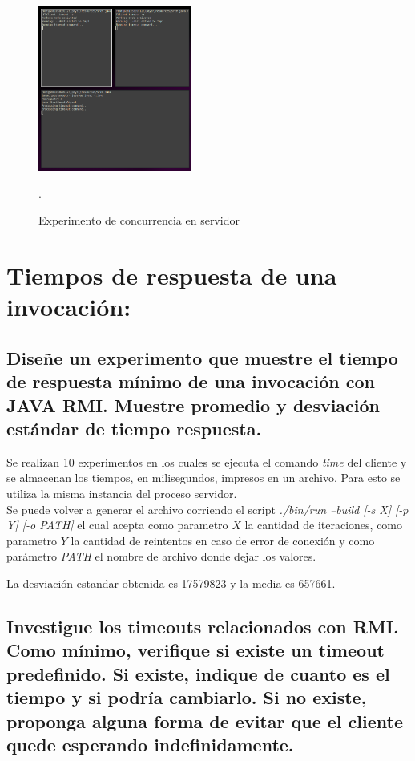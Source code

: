 \documentclass[osajnl,twocolumn,showpacs,superscriptaddress,10pt]{revtex4-1} %
\begin{document}
\begin{figure}[H]
    \centering
    \includegraphics[width=0.45\textwidth]{concu}
    \caption{Experimento de concurrencia en servidor}.
    \label{figure:concu}
\end{figure}

\section{Tiempos de respuesta de una invocación:}

\subsection{Diseñe un experimento que muestre el tiempo de respuesta mínimo de una invocación con
JAVA RMI. Muestre promedio y desviación estándar de tiempo respuesta.}

Se realizan 10 experimentos en los cuales se ejecuta el comando \textit{time} del cliente y se almacenan
los tiempos, en milisegundos, impresos en un archivo. Para esto se utiliza la misma instancia del proceso servidor. \\

Se puede volver a generar el archivo corriendo el script \textit{./bin/run --build [-s X] [-p Y] [-o PATH]}
el cual acepta como parametro $X$ la cantidad de iteraciones, como parametro $Y$ la cantidad de reintentos en caso de error de conexión y como parámetro \textit{PATH} el nombre de archivo donde dejar los valores.

La desviación estandar obtenida es 17579823 y la media es 657661.

\subsection{Investigue los timeouts relacionados con RMI. Como mínimo, verifique si existe un timeout
predefinido. Si existe, indique de cuanto es el tiempo y si podría cambiarlo. Si no existe,
proponga alguna forma de evitar que el cliente quede esperando indefinidamente.}
\end{document}
